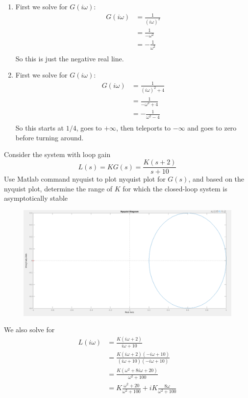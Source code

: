 \documentclass[11pt]{article}
\begin{document}
\begin{enumerate}
    \item First we solve for $G(i\omega)$:
    \begin{align*}
        G(i\omega) &= \frac{1}{(i\omega)^2} \\
        &= \frac{1}{- \omega^2} \\
        &= -\frac{1}{\omega^2} \\
    \end{align*}
    So this is just the negative real line.

    \item First we solve for $G(i\omega)$:
    \begin{align*}
        G(i\omega) &= \frac{1}{(i\omega)^2 + 4} \\
        &= \frac{1}{- \omega^2 + 4} \\
        &= -\frac{1}{\omega^2 - 4} \\
    \end{align*}
    So this starts at $1/4$, goes to $+ \infty$, then teleports to $-\infty$ and goes to zero before turning around.

\end{enumerate}







Consider the system with loop gain
$$
L(s) = KG(s) = \frac{K(s+2)}{s+10}
$$
Use Matlab command nyquist to plot nyquist plot for $G(s)$, and based
on the nyquist plot, determine the range of $K$ for which the closed-loop system is asymptotically stable
\soln

\begin{figure}[h] 
    \centering
    \includegraphics[width=0.55 \linewidth]{11-20-nyquist.png}
    \caption{}
    \label{fig:}
\end{figure}

We also solve for 
\begin{align*}
    L(i\omega) &= \frac{K(i\omega + 2)}{i\omega + 10} \\
    &= \frac{K(i\omega + 2)(-i\omega + 10)}{(i\omega + 10)(-i\omega + 10)} \\
    &= \frac{K(\omega^2 + 8i\omega + 20)}{\omega^2 + 100} \\
    &= K \frac{\omega^2 + 20}{\omega^2 + 100}  + iK \frac{8\omega}{\omega^2 + 100} \\\\
\end{align*}
\end{document}
